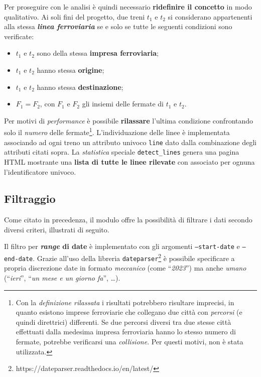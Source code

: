\documentclass[12pt,a4paper,italian]{report}
\begin{document}
Per proseguire con le analisi è quindi necessario \textbf{ridefinire
    il concetto} in modo qualitativo.  Ai soli fini del progetto, due
treni $t_1$ e $t_2$ si considerano appartenenti alla stessa
\textbf{\textit{linea ferroviaria}} se e solo se tutte le seguenti
condizioni sono verificate:
\begin{itemize}
    \item $t_1$ e $t_2$ sono della stessa \textbf{impresa
        ferroviaria};
    \item $t_1$ e $t_2$ hanno stessa \textbf{origine};
    \item $t_1$ e $t_2$ hanno stessa \textbf{destinazione};
    \item $F_1 = F_2$, con $F_1$ e $F_2$ gli insiemi delle fermate di
    $t_1$ e $t_2$.
\end{itemize}

Per motivi di \textit{performance} è possibile \textbf{rilassare}
l'ultima condizione confrontando solo il \textit{numero} delle
fermate\footnote{Con la \textit{definizione rilassata} i risultati
    potrebbero risultare imprecisi, in quanto esistono imprese
    ferroviarie che collegano due città con \textit{percorsi} (e
    quindi direttrici) differenti.  Se due percorsi diversi tra due
    stesse città effettuati dalla medesima impresa ferroviaria hanno
    lo stesso numero di fermate, potrebbe verificarsi una
    \textit{collisione}. Per questi motivi, non è stata utilizzata.}.
L'individuazione delle linee è implementata associando ad ogni treno
un attributo univoco \texttt{line} dato dalla combinazione degli
attributi citati sopra.  La \textit{statistica} speciale
\texttt{detect\-\_lines} genera una pagina HTML mostrante una
\textbf{lista di tutte le linee rilevate} con associato per ognuna
l'identificatore univoco.

\subsection{Filtraggio}

Come citato in precedenza, il modulo offre la possibilità di filtrare
i dati secondo diversi criteri, illustrati di seguito.

Il filtro per \textbf{\textit{range} di date} è implementato con gli
argomenti \texttt{--start\--date} e \texttt{--end\--date}.  Grazie
all'uso della libreria
\texttt{dateparser}\footnote{https://dateparser.readthedocs.io/en/latest/}
è possibile specificare a propria discrezione date in formato
\textit{meccanico} (come ``\textit{2023}'') ma anche
\textit{umano} (``\textit{ieri}'', ``\textit{un mese e un giorno
    fa}'', \dots).
\end{document}
